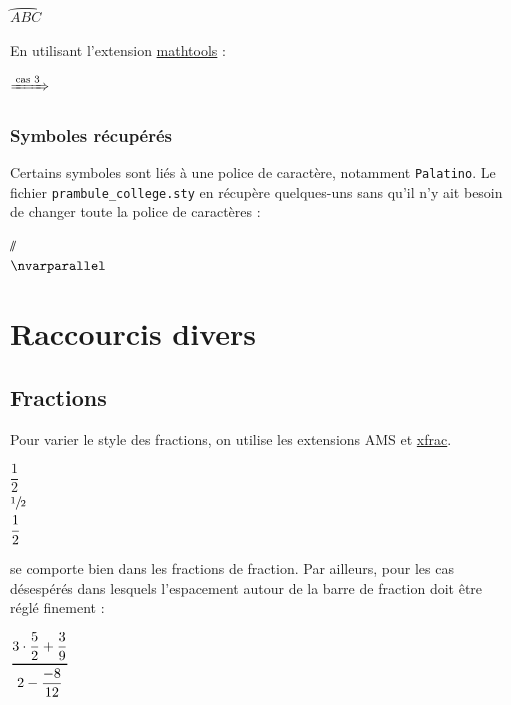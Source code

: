 \begin{LTXexample}[pos=o,width=.3]
$\wideparen{ABC}$
\end{LTXexample}


En utilisant l'extension \href{https://www.ctan.org/pkg/mathtools}{mathtools} :
\begin{LTXexample}[pos=o,width=.3]
$\xRightarrow{\parbox{.7cm}{\centering\scriptsize cas 3}}$
\end{LTXexample}


\subsubsection{Symboles récupérés}

Certains symboles sont liés à une police de caractère, notamment \texttt{Palatino}. Le fichier \texttt{prambule_college.sty} en récupère quelques-uns sans qu'il n'y ait besoin de changer toute la police de caractères :

\begin{LTXexample}[pos=o,width=.3]
$\varparallel$  \\ %
$\nvarparallel$    %
\end{LTXexample}





\section{Raccourcis divers}



\subsection{Fractions}

Pour varier le style des fractions, on utilise les extensions AMS et \href{http://mirror.ctan.org/macros/latex/contrib/l3packages/xfrac.pdf}{xfrac}.
\begin{LTXexample}[pos=o,width=.3]
$\dfrac{1}{2}$ \\[1ex]
$\sfrac{1}{2}$ \\[1ex]
$\cfrac{1}{2}$
\end{LTXexample}

\texttt{\cfrac} se comporte bien dans les fractions de fraction. Par ailleurs, pour les cas désespérés dans lesquels l'espacement autour de la barre de fraction doit être réglé finement :
\begin{LTXexample}[pos=o,width=.15]
$\genfrac{}{}{0.9pt}{0}{3\cdot \dfrac52 + \dfrac39} {2-\dfrac{-8}{12}}$
\end{LTXexample}




